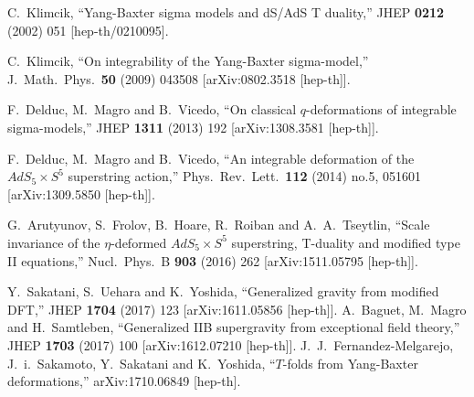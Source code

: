 \documentclass[12pt]{article}
\begin{document}
\begin{thebibliography}{99}



{\small

  C.~Klimcik,
  ``Yang-Baxter sigma models and dS/AdS T duality,''
  JHEP {\bf 0212} (2002) 051
  [hep-th/0210095].
  

  C.~Klimcik,
  ``On integrability of the Yang-Baxter sigma-model,''
  J.\ Math.\ Phys.\  {\bf 50} (2009) 043508
  [arXiv:0802.3518 [hep-th]].
  
  

  
  F.~Delduc, M.~Magro and B.~Vicedo,
  ``On classical $q$-deformations of integrable sigma-models,''
  JHEP {\bf 1311} (2013) 192
  [arXiv:1308.3581 [hep-th]].
  
  
  F.~Delduc, M.~Magro and B.~Vicedo,
  ``An integrable deformation of the $AdS_5 \times S^5$ superstring action,''
  Phys.\ Rev.\ Lett.\  {\bf 112} (2014) no.5,  051601
  [arXiv:1309.5850 [hep-th]].


  G.~Arutyunov, S.~Frolov, B.~Hoare, R.~Roiban and A.~A.~Tseytlin,
   ``Scale invariance of the $\eta$-deformed $AdS_5\times S^5$ superstring, T-duality and modified type II equations,''
  Nucl.\ Phys.\ B {\bf 903} (2016) 262
  [arXiv:1511.05795 [hep-th]].


  Y.~Sakatani, S.~Uehara and K.~Yoshida,
 ``Generalized gravity from modified DFT,''
  JHEP {\bf 1704} (2017) 123
  [arXiv:1611.05856 [hep-th]].
  A.~Baguet, M.~Magro and H.~Samtleben,
 ``Generalized IIB supergravity from exceptional field theory,''
  JHEP {\bf 1703} (2017) 100
  [arXiv:1612.07210 [hep-th]].
  J.~J.~Fernandez-Melgarejo, J.~i.~Sakamoto, Y.~Sakatani and K.~Yoshida,
  ``$T$-folds from Yang-Baxter deformations,''
  arXiv:1710.06849 [hep-th].
  
}
\end{thebibliography}
\end{document}
